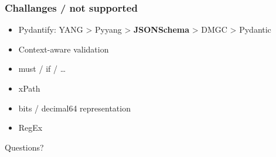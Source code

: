\documentclass[aspectratio=169]{beamer}
\begin{document}
\begin{frame}
  \frametitle{Challanges / not supported}
  \begin{itemize}
    \setlength\itemsep{1em}
    \item Pydantify: YANG > Pyyang > \textbf{JSONSchema} > DMGC > Pydantic
    \item Context-aware validation
    \item must / if / \dots
    \item xPath
    \item bits / decimal64 representation
    \item RegEx
  \end{itemize}
\end{frame}





{
\begin{frame}[plain,c]
  \begin{center}
    \Huge \color[rgb]{1,1,1}Questions?
  \end{center}
\end{frame}
}
\end{document}
